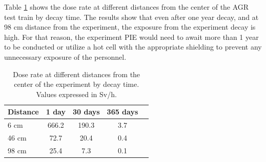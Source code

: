 

Table \ref{table:agr-dose} shows the dose rate at different distances from the center of the AGR test train by decay time.
The results show that even after one year decay, and at 98 cm distance from the experiment, the exposure from the experiment decay is high.
For that reason, the experiment \gls*{PIE} would need to await more than 1 year to be conducted or utilize a hot cell with the appropriate shielding to prevent any unnecessary exposure of the personnel.

\begin{table}[!htb]
  \centering
  \caption{Dose rate at different distances from the center of the experiment by decay time. Values expressed in Sv/h.}
  \label{table:agr-dose} 
  \begin{tabular}{lcccc}
  \toprule
  Distance   & 1 day        & 30 days        & 365 days      \\
  \midrule
  6 cm       & 666.2         & 190.3          & 3.7           \\
  46 cm      & 72.7          & 20.4           & 0.4           \\
  98 cm      & 25.4          & 7.3            & 0.1           \\
  \bottomrule
\end{tabular}
\end{table}


